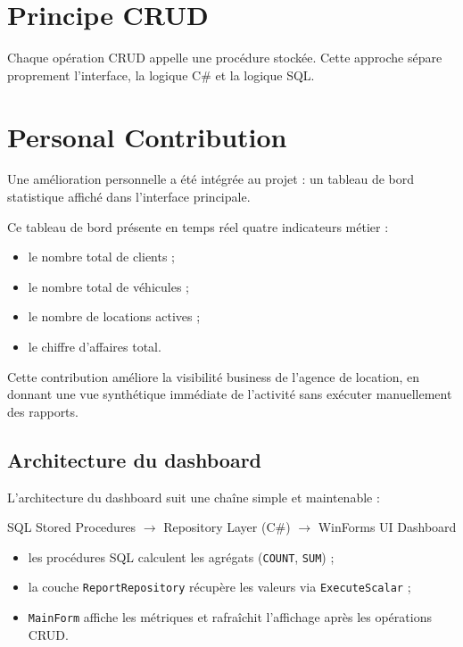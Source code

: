 \documentclass[12pt,a4paper]{report}
\begin{document}
\section{Principe CRUD}
Chaque opération CRUD appelle une procédure stockée. Cette approche sépare proprement l'interface, la logique C\# et la logique SQL.

\section{Personal Contribution}
Une amélioration personnelle a été intégrée au projet : un tableau de bord statistique affiché dans l'interface principale.

Ce tableau de bord présente en temps réel quatre indicateurs métier :
\begin{itemize}[leftmargin=1.2cm]
    \item le nombre total de clients ;
    \item le nombre total de véhicules ;
    \item le nombre de locations actives ;
    \item le chiffre d'affaires total.
\end{itemize}

Cette contribution améliore la visibilité business de l'agence de location, en donnant une vue synthétique immédiate de l'activité sans exécuter manuellement des rapports.

\subsection{Architecture du dashboard}
L'architecture du dashboard suit une chaîne simple et maintenable :

\begin{center}
    SQL Stored Procedures $\rightarrow$ Repository Layer (C\#) $\rightarrow$ WinForms UI Dashboard
\end{center}

\begin{itemize}[leftmargin=1.2cm]
    \item les procédures SQL calculent les agrégats (\texttt{COUNT}, \texttt{SUM}) ;
    \item la couche \texttt{ReportRepository} récupère les valeurs via \texttt{ExecuteScalar} ;
    \item \texttt{MainForm} affiche les métriques et rafraîchit l'affichage après les opérations CRUD.
\end{itemize}
\end{document}
